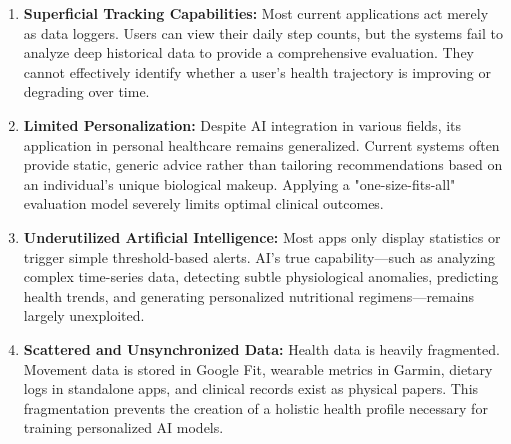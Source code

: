 \documentclass[journal, a4paper]{IEEEtran}
\begin{document}
\begin{enumerate}
    \item \textbf{Superficial Tracking Capabilities:} Most current applications act merely as data loggers. Users can view their daily step counts, but the systems fail to analyze deep historical data to provide a comprehensive evaluation. They cannot effectively identify whether a user's health trajectory is improving or degrading over time.
    \item \textbf{Limited Personalization:} Despite AI integration in various fields, its application in personal healthcare remains generalized. Current systems often provide static, generic advice rather than tailoring recommendations based on an individual's unique biological makeup. Applying a "one-size-fits-all" evaluation model severely limits optimal clinical outcomes.
    \item \textbf{Underutilized Artificial Intelligence:} Most apps only display statistics or trigger simple threshold-based alerts. AI's true capability—such as analyzing complex time-series data, detecting subtle physiological anomalies, predicting health trends, and generating personalized nutritional regimens—remains largely unexploited.
    \item \textbf{Scattered and Unsynchronized Data:} Health data is heavily fragmented. Movement data is stored in Google Fit, wearable metrics in Garmin, dietary logs in standalone apps, and clinical records exist as physical papers. This fragmentation prevents the creation of a holistic health profile necessary for training personalized AI models.
\end{enumerate}
\end{document}
